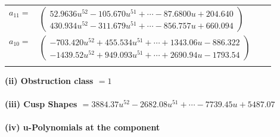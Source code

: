 \documentclass[1p]{elsarticle_modified}
\theoremstyle{definition}
\begin{document}
\begin{tabular}{m{7pt} m{180pt} m{7pt} m{180pt} }
\flushright $a_{11}=$&$\begin{pmatrix}52.9636 u^{52}-105.670 u^{51}+\cdots-87.6800 u+204.640\\430.934 u^{52}-311.679 u^{51}+\cdots-856.757 u+660.094\end{pmatrix}$ \\
\flushright $a_{10}=$&$\begin{pmatrix}-703.420 u^{52}+455.534 u^{51}+\cdots+1343.06 u-886.322\\-1439.52 u^{52}+949.093 u^{51}+\cdots+2690.94 u-1793.54\end{pmatrix}$\\&\end{tabular}
\flushleft \textbf{(ii) Obstruction class $= 1$}\\~\\
\flushleft \textbf{(iii) Cusp Shapes $= 3884.37 u^{52}-2682.08 u^{51}+\cdots-7739.45 u+5487.07$}\\~\\
\newpage\renewcommand{\arraystretch}{1}
\flushleft \textbf{(iv) u-Polynomials at the component}\newline \\
\end{document}
